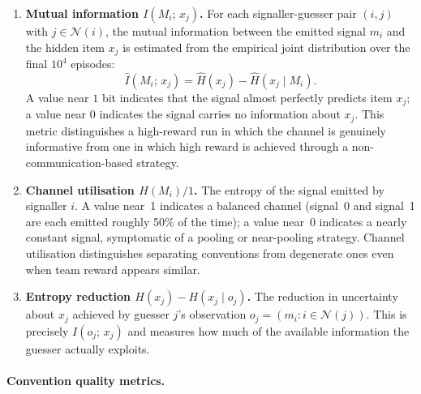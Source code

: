 \documentclass[a4paper,twoside,12pt]{report}
\begin{document}
    \begin{enumerate}[resume]
        \item \textbf{Mutual information $I(M_i;\,x_j)$.} For each
        signaller-guesser pair $(i,j)$ with $j \in \mathcal{N}(i)$, the
        mutual information between the emitted signal $m_i$ and the hidden
        item $x_j$ is estimated from the empirical joint distribution over
        the final $10^4$ episodes:
        \begin{equation}
            \hat{I}(M_i;\,x_j) = \hat{H}(x_j) - \hat{H}(x_j \mid M_i).
        \end{equation}
        A value near $1$ bit indicates that the signal almost perfectly
        predicts item $x_j$; a value near $0$ indicates the signal carries
        no information about $x_j$. This metric distinguishes a high-reward
        run in which the channel is genuinely informative from one in which
        high reward is achieved through a non-communication-based strategy.
    
        \item \textbf{Channel utilisation $H(M_i) / 1$.} The entropy of
        the signal emitted by signaller $i$. A value near~1 indicates a
        balanced channel (signal~0 and signal~1 are each emitted roughly
        50\% of the time); a value near~0 indicates a nearly constant signal,
        symptomatic of a pooling or near-pooling strategy. Channel utilisation
        distinguishes separating conventions from degenerate ones even when
        team reward appears similar.
    
        \item \textbf{Entropy reduction $H(x_j) - H(x_j \mid o_j)$.}
        The reduction in uncertainty about $x_j$ achieved by guesser $j$'s
        observation $o_j = (m_i : i \in \mathcal{N}(j))$. This is precisely
        $I(o_j;\,x_j)$ and measures how much of the available information
        the guesser actually exploits.
    \end{enumerate}
    
    \paragraph{Convention quality metrics.}
    
\end{document}

